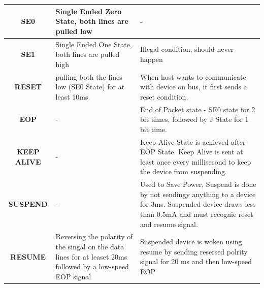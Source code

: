 \documentclass{article}
\begin{document}
\begin{table}[H]
\begin{center}
\begin{tabular}{|c|p{5cm}|p{10cm}|}
            \hline
            \textbf{SE0}        & Single Ended Zero State, both lines are pulled low                                                                                                              & -                                                                                                                                                                   \\
            \hline
            \textbf{SE1}        & Single Ended One State, both lines are pulled high                                                                                                              & Illegal condition, should never happen                                                                                                                              \\
            \hline
            \textbf{RESET}      & pulling both the lines low (SE0 State) for at least 10ms.                                                                                                       & When host wants to communicate with device on bus, it first sends a reset condition.                                                                                \\
            \hline
            \textbf{EOP}        & -                                                                                                                                                               & End of Packet state - SE0 state for 2 bit times, followed by J State for 1 bit time.                                                                                \\
            \hline
            \textbf{KEEP ALIVE} & -                                                                                                                                                               & Keep Alive State is achieved after EOP State. Keep Alive is sent at least once every millisecond to keep the device from suspending.                                \\
            \hline
            \textbf{SUSPEND}    & -                                                                                                                                                               & Used to Save Power, Suspend is done by not sendingy anything to a device for 3ms. Suspended device draws less than 0.5mA and must recognie reset and resume signal. \\
            \hline
            \textbf{RESUME}     & Reversing the polarity of the singal on the data lines for at leaset 20ms followed by a low-speed EOP signal                                                    & Suspended device is woken using resume by sending resersed polrity signal for 20 ms and then low-speed EOP                                                          \\
            \hline
        \end{tabular}
    \end{center}
\end{table}
\end{document}
